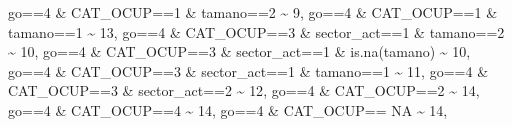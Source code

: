 \documentclass[
]{book}
\newenvironment{Shaded}{\begin{snugshade}}{\end{snugshade}}
\newcommand{\ConstantTok}[1]{\textcolor[rgb]{0.00,0.00,0.00}{#1}}
\newcommand{\DecValTok}[1]{\textcolor[rgb]{0.00,0.00,0.81}{#1}}
\newcommand{\FunctionTok}[1]{\textcolor[rgb]{0.00,0.00,0.00}{#1}}
\newcommand{\NormalTok}[1]{#1}
\newcommand{\SpecialCharTok}[1]{\textcolor[rgb]{0.00,0.00,0.00}{#1}}
\begin{document}
\begin{Shaded}
\begin{Highlighting}[]
\NormalTok{                               go}\SpecialCharTok{==}\DecValTok{4} \SpecialCharTok{\&}\NormalTok{ CAT\_OCUP}\SpecialCharTok{==}\DecValTok{1} \SpecialCharTok{\&}\NormalTok{ tamano}\SpecialCharTok{==}\DecValTok{2}  \SpecialCharTok{\textasciitilde{}} \DecValTok{9}\NormalTok{,    }
\NormalTok{                               go}\SpecialCharTok{==}\DecValTok{4} \SpecialCharTok{\&}\NormalTok{ CAT\_OCUP}\SpecialCharTok{==}\DecValTok{1} \SpecialCharTok{\&}\NormalTok{ tamano}\SpecialCharTok{==}\DecValTok{1}  \SpecialCharTok{\textasciitilde{}} \DecValTok{13}\NormalTok{,   }
\NormalTok{                               go}\SpecialCharTok{==}\DecValTok{4} \SpecialCharTok{\&}\NormalTok{ CAT\_OCUP}\SpecialCharTok{==}\DecValTok{3} \SpecialCharTok{\&}\NormalTok{ sector\_act}\SpecialCharTok{==}\DecValTok{1} \SpecialCharTok{\&}\NormalTok{ tamano}\SpecialCharTok{==}\DecValTok{2}  \SpecialCharTok{\textasciitilde{}} \DecValTok{10}\NormalTok{,   }
\NormalTok{                               go}\SpecialCharTok{==}\DecValTok{4} \SpecialCharTok{\&}\NormalTok{ CAT\_OCUP}\SpecialCharTok{==}\DecValTok{3} \SpecialCharTok{\&}\NormalTok{ sector\_act}\SpecialCharTok{==}\DecValTok{1} \SpecialCharTok{\&} \FunctionTok{is.na}\NormalTok{(tamano)  }\SpecialCharTok{\textasciitilde{}} \DecValTok{10}\NormalTok{,   }
\NormalTok{                               go}\SpecialCharTok{==}\DecValTok{4} \SpecialCharTok{\&}\NormalTok{ CAT\_OCUP}\SpecialCharTok{==}\DecValTok{3} \SpecialCharTok{\&}\NormalTok{ sector\_act}\SpecialCharTok{==}\DecValTok{1} \SpecialCharTok{\&}\NormalTok{ tamano}\SpecialCharTok{==}\DecValTok{1}  \SpecialCharTok{\textasciitilde{}} \DecValTok{11}\NormalTok{,   }
\NormalTok{                               go}\SpecialCharTok{==}\DecValTok{4} \SpecialCharTok{\&}\NormalTok{ CAT\_OCUP}\SpecialCharTok{==}\DecValTok{3} \SpecialCharTok{\&}\NormalTok{ sector\_act}\SpecialCharTok{==}\DecValTok{2} \SpecialCharTok{\textasciitilde{}} \DecValTok{12}\NormalTok{,}
\NormalTok{                               go}\SpecialCharTok{==}\DecValTok{4} \SpecialCharTok{\&}\NormalTok{ CAT\_OCUP}\SpecialCharTok{==}\DecValTok{2}  \SpecialCharTok{\textasciitilde{}} \DecValTok{14}\NormalTok{,   }
\NormalTok{                               go}\SpecialCharTok{==}\DecValTok{4} \SpecialCharTok{\&}\NormalTok{ CAT\_OCUP}\SpecialCharTok{==}\DecValTok{4}  \SpecialCharTok{\textasciitilde{}} \DecValTok{14}\NormalTok{,   }
\NormalTok{                               go}\SpecialCharTok{==}\DecValTok{4} \SpecialCharTok{\&}\NormalTok{ CAT\_OCUP}\SpecialCharTok{==} \ConstantTok{NA} \SpecialCharTok{\textasciitilde{}} \DecValTok{14}\NormalTok{,}
         

\end{Highlighting}
\end{Shaded}
\end{document}
